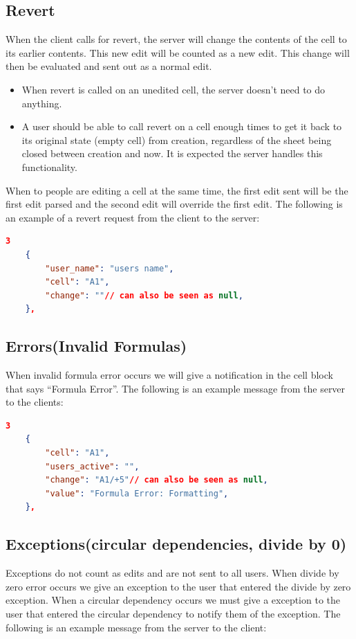 \documentclass[titlepage]{article}
\begin{document}
\subsection{Revert}
    When the client calls for revert, the server will change the contents of the cell to its earlier
    contents. This new edit will be counted as a new edit. This change will then be evaluated and sent out
    as a normal edit.
    \begin{itemize}
        \item When revert is called on an unedited cell, the server doesn’t need to do anything.
        \item A user should be able to call revert on a cell enough times to get it back to its original
         state (empty cell) from creation, regardless of the sheet being closed between creation and now.
         It is expected the server handles this functionality.
    \end{itemize}
    When to people are editing a cell at the same time, the first edit sent will be the first edit parsed and the second edit will override the first edit.
    The following is an example of a revert request from the client to the server:
    \begin{lstlisting}[language=json,firstnumber=1]
    3
    {
        "user_name": "users name",
        "cell": "A1",
        "change": ""// can also be seen as null,
    }, 
    \end{lstlisting}
    
\subsection{Errors(Invalid Formulas)}
    When invalid formula error occurs we will give a notification in the cell block that says
     “Formula Error”. The following is an example message from the server to the clients:
     \begin{lstlisting}[language=json,firstnumber=1]
    3
    {
        "cell": "A1",
        "users_active": "",
        "change": "A1/+5"// can also be seen as null,
        "value": "Formula Error: Formatting",
    }, 
    \end{lstlisting}
\subsection{Exceptions(circular dependencies, divide by 0)}
    Exceptions do not count as edits and are not sent to all users. When divide by zero error
    occurs we give an exception to the user that entered the divide by zero exception. When
    a circular dependency occurs we must give a exception to the user that entered the circular 
    dependency to notify them of the exception. The following is an example message from the
    server to the client:
\end{document}
